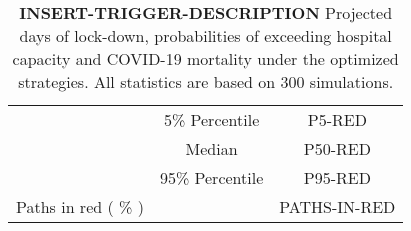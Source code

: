 \documentclass{article}
\begin{document}
\begin{table}[!htb]
\begin{tabular}{p{4cm}cc}
		& 5\% Percentile    & P5-RED                     \\ \cmidrule(l){2-3} 
		& Median    & P50-RED                      \\ \cmidrule(l){2-3} 
		& 95\% Percentile    & P95-RED                     \\   \midrule   
		\multirow{1}{*}{Paths in red ( \% )} &      &         PATHS-IN-RED            \\  \bottomrule
	\end{tabular}
	\caption{\textbf{INSERT-TRIGGER-DESCRIPTION} 
		 Projected days of lock-down, probabilities of exceeding hospital capacity and COVID-19 mortality under the optimized strategies. All statistics are based on 300 simulations.}
	\label{table:summary_table_tiers}
\end{table}   
\end{document}

